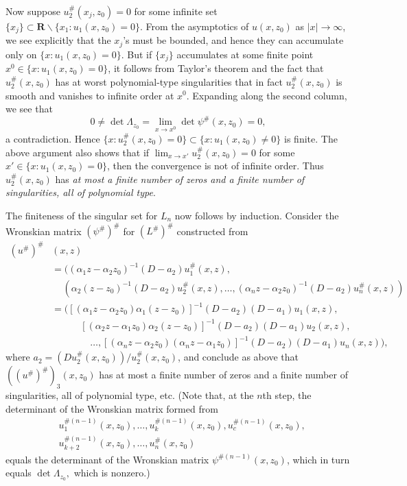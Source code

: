 \documentclass{surv-l}
\theoremstyle{plain}
\theoremstyle{definition}
\numberwithin{equation}{chapter}
\begin{document}
Now suppose $u_{2}^{\#}(x_{j}, z_{0})=0$ for some infinite set $\{x_{j}\}\subset \textbf{R}\backslash \{x_{1}:u_{1}(x, z_{0})= 0\}$. From the asymptotics of $u(x, z_{0})$ as $|x|\rightarrow\infty$, we see explicitly that the $x_{j}$'s must be bounded, and hence they can accumulate only on $\{x:u_{1}(x, z_{0})=0\}$. But if $\{x_{j}\}$ accumulates at some finite point $x^{0}\in\{x:u_{1}(x, z_{0})=0\}$, it follows from Taylor's theorem and the fact that $u_{2}^{\#}(x, z_{0})$ has at worst polynomial-type singularities that in fact $u_{2}^{\#}(x, z_{0})$ is smooth and vanishes to infinite order at $x^{0}$. Expanding along the second column, we see that
\begin{equation*}
0\neq\det\Lambda_{z_{0}}=\lim_{x\rightarrow x^{0}}\det\psi^{\#}(x, z_{0})=0,
\end{equation*}
a contradiction. Hence $\{x:u_{2}^{\#}(x, z_{0})=0\}\subset\{x:u_{1}(x, z_{0})\neq 0\}$ is finite. The above argument also shows that if $\lim_{x\rightarrow x'}u_{2}^{\#}(x, z_{0})=0$ for some $x'\in\{x : u_{1}(x, z_{0})=0\}$, then the convergence is not of infinite order. Thus $u_{2}^{\#}(x, z_{0})$ has \emph{at most a finite number of zeros and a finite number of singularities, all of polynomial type}.

The finiteness of the singular set for $L_{n}$ now follows by induction. Consider the Wronskian matrix $(\psi^{\#})^{\#}$ for $(L^{\#})^{\#}$ constructed from
\begin{align*}
(u^{\#})^{\#}&(x, z)\\
& =((\alpha_{1}z-\alpha_{2}z_{0})^{-1}(D-a_{2})u_{1}^{\#}(x, z),\\
&\quad\,(\alpha_{2}(z-z_{0})^{-1}(D-a_{2})u_{2}^{\#}(x, z),\ldots,(\alpha_{n}z-\alpha_{2}z_{0})^{-1}(D-a_{2})u_{n}^{\#}(x, z))\\
& =([(\alpha_{1}z-\alpha_{2}z_{0})\alpha_{1}(z-z_{0})]^{-1}(D-a_{2})(D-a_{1})u_{1}(x, z),\\
& \quad \qquad [(\alpha_{2}z-\alpha_{1}z_{0})\alpha_{2}(z-z_{0})]^{-1}(D-a_{2})(D-a_{1})u_{2}(x, z),\\
& \qquad \qquad \ldots,[(\alpha_{n}z-\alpha_{2}z_{0})(\alpha_{n}z-\alpha_{1}z_{0})]^{-1}(D-a_{2})(D-a_{1})u_{n}(x, z)),
\end{align*}
where $a_{2}=(Du_{2}^{\#}(x, z_{0}))/u_{2}^{\#}(x, z_{0})$, and conclude as above that $((u^{\#})^{\#})_{3}(x, z_{0})$ has at most a finite number of zeros and a finite number of singularities, all of polynomial type, etc. (Note that, at the $n$th step, the determinant of the Wronskian matrix formed from
\begin{align*}
&u_{1}^{\#(n-1)}(x,z_{0}),\ldots, u_{k}^{\#(n-1)}(x, z_{0}),u_{c}^{\#(n-1)}(x, z_{0}), \\
&u_{k+2}^{\#(n-1)}(x, z_{0}),\ldots,u_{n}^{\#}(x, z_{0})
\end{align*}
equals the determinant of the Wronskian matrix $\psi^{\#(n-1)}(x, z_{0})$, which in turn equals $\det\Lambda_{z_{0}},$ which is nonzero.)
\end{document}

